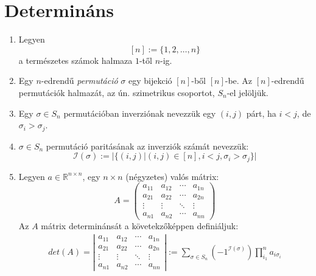 \documentclass{article}
\begin{document}
    \section{Determináns}
        \begin{enumerate}[label=(\alph*)]
            \item Legyen
                $$[n] := \{1,2,\dotsc,n\}$$
                a természetes számok halmaza $1$-től $n$-ig.
            \item Egy $n$-edrendű \textit{permutáció} $\sigma$ egy bijekció $[n]$-ből $[n]$-be. Az $[n]$-edrendű permutációk halmazát, az ún. szimetrikus csoportot, $S_n$-el jelöljük.
            \item Egy $\sigma \in S_n$ permutációban inverziónak nevezzük egy $(i,j)$ párt, ha $i < j$, de $\sigma_i > \sigma_j$.
            \item $\sigma \in S_n$ permutáció paritásának az inverziók számát nevezzük:
                $$\mathcal{I}(\sigma) := \bigg|\Big\{(i,j)|(i,j) \in [n], i < j, \sigma_i > \sigma_j\Bigr\}\biggr|$$
            \item Legyen $a \in \mathbb{R}^{n\times n}$, egy $n \times n$ (négyzetes) valós mátrix:
                $$A=
                    \left( 
                        \begin{matrix}
                            a_{11} & a_{12} & \cdots & a_{1n}\\
                            a_{21} & a_{22} & \cdots & a_{2n}\\
                            \vdots & \vdots & \ddots & \vdots\\
                            a_{n1} & a_{n2} & \cdots & a_{nn}
                        \end{matrix} 
                    \right)$$
                    Az $A$ mátrix determinánsát a követekzőképpen definiáljuk:
                    \begin{gather}
                        det(A)=
                        \left| 
                            \begin{matrix}
                                a_{11} & a_{12} & \cdots & a_{1n}\\
                                a_{21} & a_{22} & \cdots & a_{2n}\\
                                \vdots & \vdots & \ddots & \vdots\\
                                a_{n1} & a_{n2} & \cdots & a_{nn}
                            \end{matrix} 
                        \right|
                    :=\sum_{\sigma \in S_n}(-1^{\mathcal{I}(\sigma)}) \prod_{i_1}^na_{i\sigma_i}
                    \end{gather}
        \end{enumerate}
        
\end{document}
